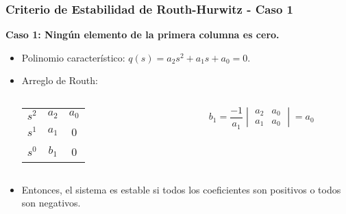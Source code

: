 \documentclass[aspectratio=169]{beamer}
\theoremstyle{definition}
\theoremstyle{plain}
\theoremstyle{remark}
\begin{document}
\begin{frame}[<+->]\frametitle{Criterio de Estabilidad de Routh-Hurwitz - Caso 1}
\textbf{Caso 1: Ningún elemento de la primera columna es cero.}
\begin{itemize}
	\item Polinomio característico: $q(s) = a_2 s^2 + a_1 s + a_0 = 0$.
	\item Arreglo de Routh:\\
	\centering	
	\begin{columns}
	\begin{column}{0.2\textwidth}
	\begin{tabular}{c|cc}
		$s^2$ & $a_2$ & $a_0$\\
		$s^1$ & $a_1$ & 0\\
		$s^0$ & $b_1$ & 0
	\end{tabular}
	\end{column}	
	\begin{column}{0.2\textwidth}
	\begin{equation*}
		b_1 = \frac{-1}{a_1}
		\begin{vmatrix}
			a_2 & a_0\\
			a_1 & a_0
		\end{vmatrix} = a_0
	\end{equation*}
	\end{column}	
	\end{columns}
	\item Entonces, el sistema es estable si todos los coeficientes son positivos o todos son negativos.
\end{itemize}
\end{frame}
\end{document}

